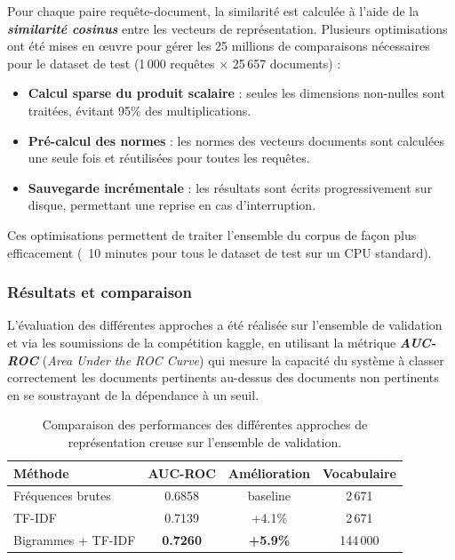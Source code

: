\documentclass{rapportECL}
\begin{document}
Pour chaque paire requête-document, la similarité est calculée à l'aide de la \textit{\textbf{similarité cosinus}} entre les vecteurs de représentation. Plusieurs optimisations ont été mises en œuvre pour gérer les 25 millions de comparaisons nécessaires pour le dataset de test (1\,000 requêtes × 25\,657 documents) :

\begin{itemize}
    \item \textbf{Calcul sparse du produit scalaire} : seules les dimensions non-nulles sont traitées, évitant 95\% des multiplications.
    \item \textbf{Pré-calcul des normes} : les normes des vecteurs documents sont calculées une seule fois et réutilisées pour toutes les requêtes.
    \item \textbf{Sauvegarde incrémentale} : les résultats sont écrits progressivement sur disque, permettant une reprise en cas d'interruption.
\end{itemize}

Ces optimisations permettent de traiter l'ensemble du corpus de façon plus efficacement (~10 minutes pour tous le dataset de test sur un CPU standard).

\subsubsection{Résultats et comparaison}

L'évaluation des différentes approches a été réalisée sur l'ensemble de validation et via les soumissions de la compétition kaggle, en utilisant la métrique \textit{\textbf{AUC-ROC}} (\textit{Area Under the ROC Curve}) qui mesure la capacité du système à classer correctement les documents pertinents au-dessus des documents non pertinents en se soustrayant de la dépendance à un seuil.

\begin{table}[H]
\centering
\begin{tabular}{lccc}
\toprule
Méthode & AUC-ROC & Amélioration & Vocabulaire \\
\midrule
Fréquences brutes & 0.6858 & baseline & 2\,671 \\
TF-IDF & 0.7139 & +4.1\% & 2\,671 \\
Bigrammes + TF-IDF & \textbf{0.7260} & \textbf{+5.9\%} & 144\,000 \\
\bottomrule
\end{tabular}
\caption{Comparaison des performances des différentes approches de représentation creuse sur l'ensemble de validation.}
\label{tab:sparse_results}
\end{table}
\end{document}
